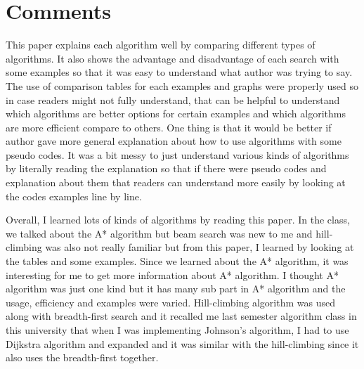 \documentclass[12pt]{article}
\begin{document}
\section{Comments}
	This paper explains each algorithm well by comparing different types of algorithms. It also shows the advantage and disadvantage of each search with some examples so that it was easy to understand what author was trying to say. The use of comparison tables for each examples and graphs were properly used so in case readers might not fully understand, that can be helpful to understand which algorithms are better options for certain examples and which algorithms are more efficient compare to others. One thing is that it would be better if author gave more general explanation about how to use algorithms with some pseudo codes. It was a bit messy to just understand various kinds of algorithms by literally reading the explanation so that if there were pseudo codes and explanation about them that readers can understand more easily by looking at the codes examples line by line. \par
    Overall, I learned lots of kinds of algorithms by reading this paper. In the class, we talked about the A* algorithm but beam search was new to me and hill-climbing was also not really familiar but from this paper, I learned by looking at the tables and some examples. Since we learned about the A* algorithm, it was interesting for me to get more information about A* algorithm. I thought A* algorithm was just one kind but it has many sub part in A* algorithm and the usage, efficiency and examples were varied. Hill-climbing algorithm was used along with breadth-first search and it recalled me last semester algorithm class in this university that when I was implementing Johnson's algorithm, I had to use Dijkstra algorithm and expanded and it was similar with the hill-climbing since it also uses the breadth-first together.
\newpage


\end{document}
